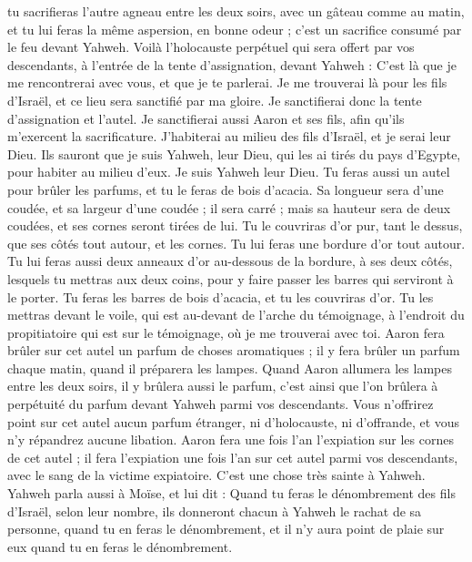 \begin{multicols}{2}
tu sacrifieras l'autre agneau entre les deux soirs, avec un gâteau comme au matin, et tu lui feras la même aspersion, en bonne odeur ; c'est un sacrifice consumé par le feu devant Yahweh.
Voilà l’holocauste perpétuel qui sera offert par vos descendants, à l’entrée de la tente d’assignation, devant Yahweh : C’est là que je me rencontrerai avec vous, et que je te parlerai.
Je me trouverai là pour les fils d'Israël, et ce lieu sera sanctifié par ma gloire.
Je sanctifierai donc la tente d'assignation et l'autel. Je sanctifierai aussi Aaron et ses fils, afin qu'ils m'exercent la sacrificature.
J'habiterai au milieu des fils d'Israël, et je serai leur Dieu.
Ils sauront que je suis Yahweh, leur Dieu, qui les ai tirés du pays d'Egypte, pour habiter au milieu d'eux. Je suis Yahweh leur Dieu.
\VerseOne{}Tu feras aussi un autel pour brûler les parfums, et tu le feras de bois d’acacia.
Sa longueur sera d'une coudée, et sa largeur d'une coudée ; il sera carré ; mais sa hauteur sera de deux coudées, et ses cornes seront tirées de lui.
Tu le couvriras d’or pur, tant le dessus, que ses côtés tout autour, et les cornes. Tu lui feras une bordure d’or tout autour.
Tu lui feras aussi deux anneaux d'or au-dessous de la bordure, à ses deux côtés, lesquels tu mettras aux deux coins, pour y faire passer les barres qui serviront à le porter.
Tu feras les barres de bois d’acacia, et tu les couvriras d'or.
Tu les mettras devant le voile, qui est au-devant de l'arche du témoignage, à l'endroit du propitiatoire qui est sur le témoignage, où je me trouverai avec toi.
Aaron fera brûler sur cet autel un parfum de choses aromatiques ; il y fera brûler un parfum chaque matin, quand il préparera les lampes.
Quand Aaron allumera les lampes entre les deux soirs, il y brûlera aussi le parfum, c’est ainsi que l’on brûlera à perpétuité du parfum devant Yahweh parmi vos descendants.
Vous n'offrirez point sur cet autel aucun parfum étranger, ni d'holocauste, ni d'offrande, et vous n'y répandrez aucune libation.
Aaron fera une fois l'an l’expiation sur les cornes de cet autel ; il fera l’expiation une fois l'an sur cet autel parmi vos descendants, avec le sang de la victime expiatoire. C'est une chose très sainte à Yahweh.
Yahweh parla aussi à Moïse, et lui dit :
Quand tu feras le dénombrement des fils d'Israël, selon leur nombre, ils donneront chacun à Yahweh le rachat de sa personne, quand tu en feras le dénombrement, et il n'y aura point de plaie sur eux quand tu en feras le dénombrement.

\end{multicols}
